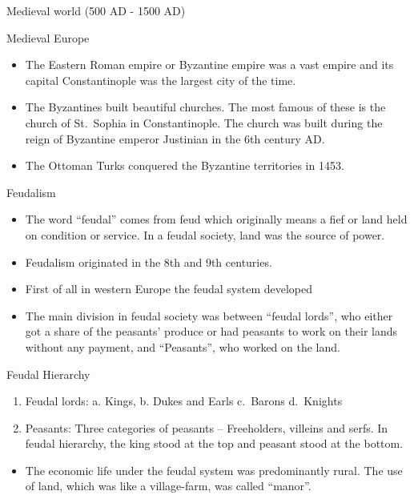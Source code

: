 \documentclass[
  openany]{book}
\providecommand{\tightlist}{%
  \setlength{\itemsep}{0pt}\setlength{\parskip}{0pt}}
\begin{document}
Medieval world (500 AD - 1500 AD)

Medieval Europe

\begin{itemize}
\tightlist
\item
  The Eastern Roman empire or Byzantine empire was a vast empire and its capital Constantinople was the largest city of the time.
\item
  The Byzantines built beautiful churches. The most famous of these is the church of St.~Sophia in Constantinople. The church was built during the reign of Byzantine emperor Justinian in the 6th century AD.
\item
  The Ottoman Turks conquered the Byzantine territories in 1453.
\end{itemize}

Feudalism

\begin{itemize}
\tightlist
\item
  The word ``feudal'' comes from feud which originally means a fief or land held on condition or service. In a feudal society, land was the source of power.
\item
  Feudalism originated in the 8th and 9th centuries.
\item
  First of all in western Europe the feudal system developed
\item
  The main division in feudal society was between ``feudal lords'', who either got a share of the peasants' produce or had peasants to work on their lands without any payment, and ``Peasants'', who worked on the land.
\end{itemize}

Feudal Hierarchy

\begin{enumerate}
\def\labelenumi{\arabic{enumi}.}
\tightlist
\item
  Feudal lords: a. Kings, b. Dukes and Earls c.~Barons d.~Knights
\item
  Peasants: Three categories of peasants -- Freeholders, villeins and serfs. In feudal hierarchy, the king stood at the top and peasant stood at the bottom.
\end{enumerate}

\begin{itemize}
\tightlist
\item
  The economic life under the feudal system was predominantly rural. The use of land, which was like a village-farm, was called ``manor''.
\end{itemize}
\end{document}
